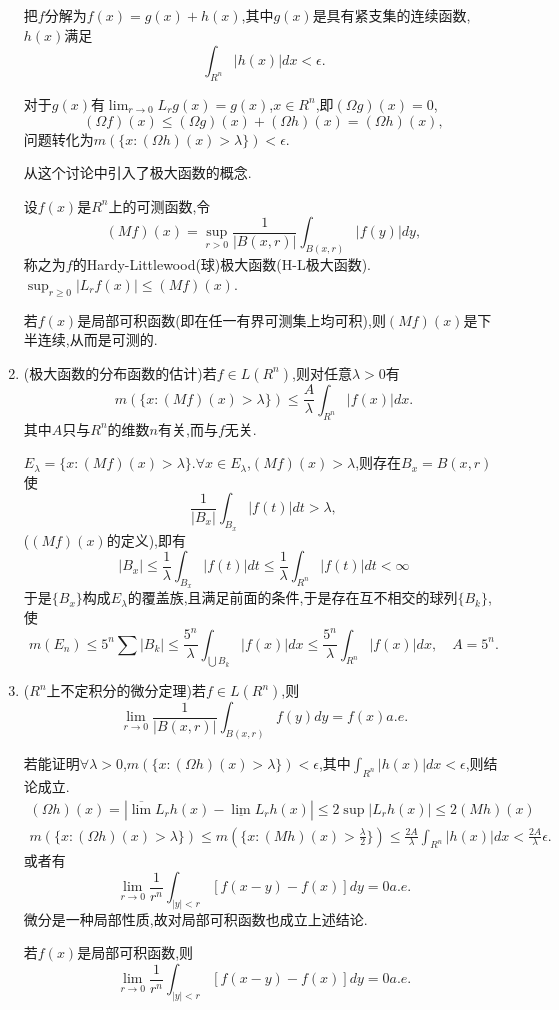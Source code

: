 \documentclass[12pt,a4paper,openany]{book}
\begin{document}
\begin{enumerate}
把$f$分解为$f(x)=g(x)+h(x)$,其中$g(x)$是具有紧支集的连续函数,$h(x)$满足
\[
\int_{R^n}{|h(x)|dx} < \epsilon.
\]

对于$g(x)$有$\lim_{r \rightarrow 0}{L_rg(x)} = g(x)$,$x \in R^n$,即$(\Omega{g})(x)=0$,
\[
(\Omega{f})(x) \le (\Omega{g})(x)+(\Omega{h})(x)=(\Omega{h})(x),
\]
问题转化为$m(\{x: (\Omega{h})(x)>\lambda\})<\epsilon$.

从这个讨论中引入了极大函数的概念.

设$f(x)$是$R^n$上的可测函数,令
\[
(Mf)(x)=\sup_{r>0}{\frac{1}{|B(x,r)|}\int_{B(x,r)}{|f(y)|dy}},
\]
称之为$f$的Hardy-Littlewood(球)极大函数(H-L极大函数).$\sup_{r \ge 0}{|L_rf(x)|} \le (Mf)(x)$.

若$f(x)$是局部可积函数(即在任一有界可测集上均可积),则$(Mf)(x)$是下半连续,从而是可测的.

\item (极大函数的分布函数的估计)若$f \in L(R^n)$,则对任意$\lambda>0$有
\[
m(\{x:(Mf)(x)>\lambda\}) \le \frac{A}{\lambda}\int_{R^n}{|f(x)|dx}.
\]
其中$A$只与$R^n$的维数$n$有关,而与$f$无关.

$E_{\lambda}=\{x: (Mf)(x)> \lambda\}$.$\forall x \in E_{\lambda}$,$(Mf)(x)>\lambda$,则存在$B_x=B(x,r)$使
\[
\frac{1}{|B_x|}\int_{B_x}{|f(t)|dt}>\lambda,
\]
($(Mf)(x)$的定义),即有
\[
|B_x| \le \frac{1}{\lambda}\int_{B_x}{|f(t)|dt}\le \frac{1}{\lambda}\int_{R^n}{|f(t)|dt}<\infty
\]
于是$\{B_x\}$构成$E_{\lambda}$的覆盖族,且满足前面的条件,于是存在互不相交的球列$\{B_k\}$,使
\[
m(E_n)\le 5^n \sum{|B_k|} \le \frac{5^n}{\lambda}\int_{\bigcup{B_k}}{|f(x)|dx} \le \frac{5^n}{\lambda}\int_{R^n}{|f(x)|dx},\quad A = 5^n.
\]

\item ($R^n$上不定积分的微分定理)若$f \in L(R^n)$,则
\[
\lim_{r \rightarrow 0}{\frac{1}{|B(x,r)|}\int_{B(x,r)}{f(y)dy}} = f(x) a.e.
\]

若能证明$\forall \lambda>0$,$m(\{x:(\Omega{h})(x)>\lambda\})<\epsilon$,其中$\int_{R^n}{|h(x)|dx}<\epsilon$,则结论成立.
\begin{gather*}
(\Omega{h})(x)=|\overline{\lim}{L_rh(x)} - \underline{\lim}{L_rh(x)}| \le 2\sup{|L_rh(x)|} \le 2(Mh)(x)\\
m(\{x:(\Omega{h})(x)>\lambda\}) \le m(\{x:(Mh)(x)>\frac{\lambda}{2}\}) \le \frac{2A}{\lambda}\int_{R^n}{|h(x)|dx}<\frac{2A}{\lambda}\epsilon.
\end{gather*}
或者有
\[
\lim_{r \rightarrow 0}{\frac{1}{r^n}\int_{|y|<r}{[f(x-y)-f(x)]dy}}=0 a.e.
\]
微分是一种局部性质,故对局部可积函数也成立上述结论.

若$f(x)$是局部可积函数,则
\[
\lim_{r \rightarrow 0}{\frac{1}{r^n}\int_{|y|<r}{[f(x-y)-f(x)]dy}}=0 a.e.
\]
\end{enumerate}
\end{document}
